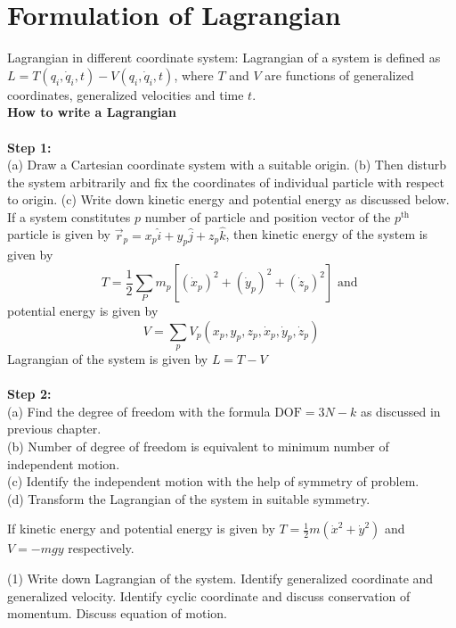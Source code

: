 \section{Formulation of Lagrangian}
Lagrangian in different coordinate system:
Lagrangian of a system is defined as $L=T\left(q_{i}, \dot{q}_{i}, t\right)-V\left(q_{i}, \dot{q}_{i}, t\right)$, where $T$ and $V$ are functions of generalized coordinates, generalized velocities and time $t$.\\
\textbf{How to write a Lagrangian}\\\\
\textbf{Step 1:}\\
(a) Draw a Cartesian coordinate system with a suitable origin.
(b) Then disturb the system arbitrarily and fix the coordinates of individual particle with respect to origin.
(c) Write down kinetic energy and potential energy as discussed below.
If a system constitutes $p$ number of particle and position vector of the $p^{\text {th }}$ particle is given by $\vec{r}_{p}=x_{p} \hat{i}+y_{p} \hat{j}+z_{p} \hat{k}$, then kinetic energy of the system is given by
$$
T=\frac{1}{2} \sum_{P} m_{p}\left[\left(\dot{x}_{p}\right)^{2}+\left(\dot{y}_{p}\right)^{2}+\left(\dot{z}_{p}\right)^{2}\right] \text { and }
$$
potential energy is given by
$$
V=\sum_{p} V_{p}\left(x_{p}, y_{p}, z_{p}, \dot{x}_{p}, \dot{y}_{p}, \dot{z}_{p}\right)
$$
Lagrangian of the system is given by $L=T-V$\\\\
\textbf{Step 2:}\\
(a) Find the degree of freedom with the formula $\mathrm{DOF}=3 N-k$ as discussed in previous chapter.\\
(b) Number of degree of freedom is equivalent to minimum number of independent motion.\\
(c) Identify the independent motion with the help of symmetry of problem.\\
(d) Transform the Lagrangian of the system in suitable symmetry.\\
\begin{exercise}
If kinetic energy and potential energy is given by $T=\frac{1}{2} m\left(\dot{x}^{2}+\dot{y}^{2}\right)$ and $V=-m g y$ respectively.
	 \begin{tasks}(1)
		\task[\textbf{a.}] Write down Lagrangian of the system.
		\task[\textbf{b.}] Identify generalized coordinate and generalized velocity.
		\task[\textbf{c.}] Identify cyclic coordinate and discuss conservation of momentum.
		\task[\textbf{d.}]  Discuss equation of motion.
	\end{tasks}
\end{exercise}
